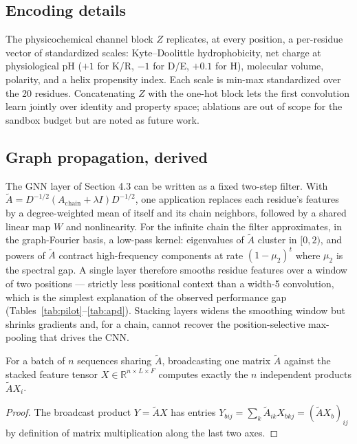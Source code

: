 \subsection{Encoding details}
The physicochemical channel block $Z$ replicates, at every position, a
per-residue vector of standardized scales: Kyte--Doolittle hydrophobicity,
net charge at physiological pH ($+1$ for K/R, $-1$ for D/E, $+0.1$ for H),
molecular volume, polarity, and a helix propensity index. Each scale is
min-max standardized over the 20 residues. Concatenating $Z$ with the one-hot
block lets the first convolution learn jointly over identity and property
space; ablations are out of scope for the sandbox budget but are noted as
future work.

\subsection{Graph propagation, derived}
The GNN layer of Section 4.3 can be written as a fixed two-step filter. With
$\tilde A = D^{-1/2}(A_{\text{chain}} + \lambda I)D^{-1/2}$, one application
replaces each residue's features by a degree-weighted mean of itself and its
chain neighbors, followed by a shared linear map $W$ and nonlinearity. For
the infinite chain the filter approximates, in the graph-Fourier basis, a
low-pass kernel: eigenvalues of $\tilde A$ cluster in $[0, 2)$, and powers of
$\tilde A$ contract high-frequency components at rate $(1-\mu_2)^t$ where
$\mu_2$ is the spectral gap. A single layer therefore smooths residue
features over a window of two positions --- strictly less positional context
than a width-5 convolution, which is the simplest explanation of the observed
performance gap (Tables~\ref{tab:pilot}--\ref{tab:apd}). Stacking layers
widens the smoothing window but shrinks gradients and, for a chain, cannot
recover the position-selective max-pooling that drives the CNN.

\begin{proposition}
For a batch of $n$ sequences sharing $\tilde A$, broadcasting one matrix
$\tilde A$ against the stacked feature tensor $X\in\mathbb{R}^{n\times L\times F}$
computes exactly the $n$ independent products $\tilde A X_i$.
\end{proposition}
\begin{proof}
The broadcast product $Y = \tilde A X$ has entries
$Y_{bij} = \sum_k \tilde A_{ik} X_{bkj} = (\tilde A X_b)_{ij}$ by definition
of matrix multiplication along the last two axes.
\end{proof}

